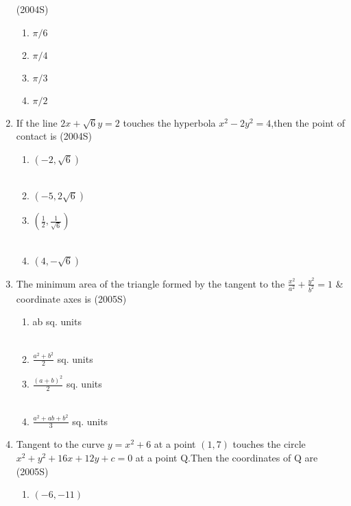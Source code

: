 \begin{enumerate}
\hfill{(2004S)}
\begin{multicols}{4}
\begin{enumerate}
    \item $\pi/6$ 
    \item $\pi/4$ 
    \item $\pi/3$
    \item $\pi/2$
\end{enumerate}
\end{multicols}
\item If the line $2x+\sqrt{6}y=2$ touches the hyperbola $x^{2}-2y^{2}=4$,then the point of contact is \hfill{(2004S)}
\begin{multicols}{2}
\begin{enumerate}
    \item ${(-2,\sqrt{6})}$\\\\
    \item ${(-5,2\sqrt{6})}$
    \item ${(\frac{1}{2},\frac{1}{\sqrt{6}})}$\\\\
    \item ${(4,-\sqrt{6})}$
\end{enumerate}
\end{multicols}
\item The minimum area of the triangle formed by the tangent to the $\frac{x^{2}}{a^{2}}+\frac{y^{2}}{b^{2}}=1$ \& coordinate axes is \hfill{(2005S)}
\begin{multicols}{2}
\begin{enumerate}
    \item ab sq. units\\\\
    \item $\frac{a^{2}+b^{2}}{2}$ sq. units
    \item $\frac{(a+b)^{2}}{2}$ sq. units\\\\
    \item $\frac{a^{2}+ab+b^{2}}{3}$ sq. units
\end{enumerate}
\end{multicols}
\item Tangent to the curve $y=x^{2}+6$ at a point ${(1,7)}$ touches the circle $x^{2}+y^{2}+16x+12y+c=0$ at a point Q.Then the coordinates of Q are \hfill{(2005S)}
\begin{multicols}{2}
\begin{enumerate}
    \item${(-6,-11)}$\\\\

\end{enumerate}
\end{multicols}
\end{enumerate}

